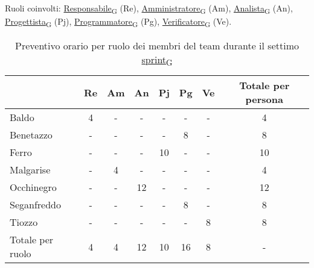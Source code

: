 \newpage
{}
Ruoli coinvolti: \href{https://7last.github.io/docs/rtb/documentazione-interna/glossario\#responsabile}{Responsabile\textsubscript{G}} (Re), \href{https://7last.github.io/docs/rtb/documentazione-interna/glossario\#amministratore}{Amministratore\textsubscript{G}} (Am), \href{https://7last.github.io/docs/rtb/documentazione-interna/glossario\#analista}{Analista\textsubscript{G}} (An), \href{https://7last.github.io/docs/rtb/documentazione-interna/glossario\#progettista}{Progettista\textsubscript{G}} (Pj), \href{https://7last.github.io/docs/rtb/documentazione-interna/glossario\#programmatore}{Programmatore\textsubscript{G}} (Pg), \href{https://7last.github.io/docs/rtb/documentazione-interna/glossario\#verificatore}{Verificatore\textsubscript{G}} (Ve).
\begin{table}[!h]
	\centering
	\begin{tabular}{ | l | c | c | c | c | c | c | c | }
		\hline
		\textbf{} & \textbf{Re} & \textbf{Am} &\textbf{An} & \textbf{Pj} & \textbf{Pg} & \textbf{Ve} & \textbf{Totale per persona} \\
		\hline
		Baldo            &  4   &  -   &  -   &  -   &  -   &  -   &  4   \\
		Benetazzo        &  -   &  -   &  -   &  -   &  8   &  -   &  8   \\
		Ferro            &  -   &  -   &  -   & 10   &  -   &  -   & 10   \\
		Malgarise        &  -   &  4   &  -   &  -   &  -   &  -   &  4   \\
		Occhinegro       &  -   &  -   & 12   &  -   &  -   &  -   & 12   \\
		Seganfreddo      &  -   &  -   &  -   &  -   &  8   &  -   &  8   \\
		Tiozzo           &  -   &  -   &  -   &  -   &  -   &  8   &  8   \\
		\hline
		Totale per ruolo &  4   &  4   & 12   & 10   & 16   &  8   &  -   \\
		\hline
	\end{tabular}
	\caption{Preventivo orario per ruolo dei membri del team durante il settimo \href{https://7last.github.io/docs/rtb/documentazione-interna/glossario\#sprint}{sprint\textsubscript{G}}}

\end{table}

